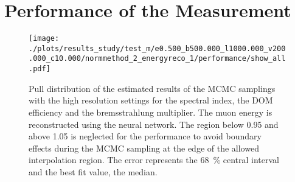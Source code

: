 

%
\section{Performance of the Measurement} \label{sec:study_perform_result_all}
%

\begin{figure}
    \centering
    \texttt{[image: ./plots/results\_study/test\_m/e0.500\_b500.000\_l1000.000\_v200.000\_c10.000/normmethod\_2\_energyreco\_1/performance/show\_all.pdf]}
    \caption{Pull distribution of the estimated results of the MCMC samplings with the high resolution settings for the spectral index, the DOM efficiency and the bremsstrahlung multiplier. The muon energy is reconstructed using the neural network. The region below 0.95 and above 1.05 is neglected for the performance to avoid boundary effects during the MCMC sampling at the edge of the allowed interpolation region. The error represents the \SI{68}{\%} central interval and the best fit value, the median.}
    \label{fig:study_result_pull_high_nn}
\end{figure}

